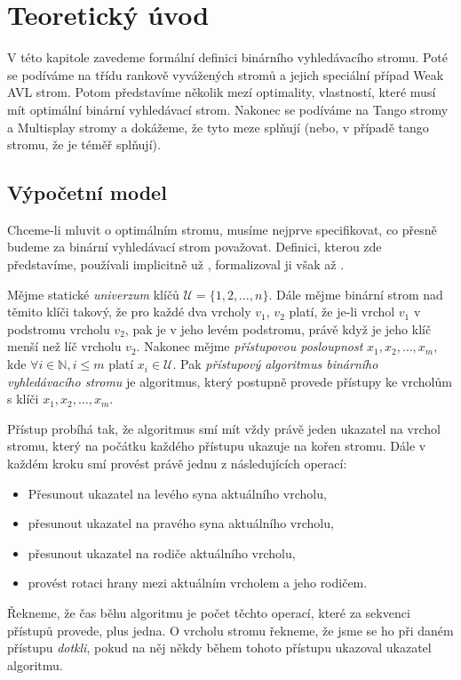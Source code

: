 \chapter{Teoretický úvod}

V této kapitole zavedeme formální definici binárního vyhledávacího stromu. Poté
se podíváme na třídu rankově vyvážených stromů a jejich speciální případ Weak
AVL strom. Potom představíme několik mezí optimality, vlastností, které musí
mít optimální binární vyhledávací strom. Nakonec se podíváme na Tango stromy a
Multisplay stromy a dokážeme, že tyto meze splňují (nebo, v případě tango
stromu, že je téměř splňují).

\section{Výpočetní model}
Chceme-li mluvit o optimálním stromu, musíme nejprve specifikovat, co přesně
budeme za binární vyhledávací strom považovat. Definici, kterou zde
představíme, používali implicitně už \citet{splay}, formalizoval ji však až
\citet{tango}.

\begin{definice}
Mějme statické \emph{univerzum} klíčů $\mathcal U = \{1,2,\dots,n\}$. Dále
mějme binární strom nad těmito klíči takový, že pro každé dva vrcholy $v_1$,
$v_2$ platí, že je-li vrchol $v_1$ v podstromu vrcholu $v_2$, pak je v jeho
levém podstromu, právě když je jeho klíč menší než líč vrcholu $v_2$. Nakonec
mějme \emph{přístupovou posloupnost} $x_1,x_2,\dots,x_m$, kde $\forall i \in
\mathbb N, i\leq m$ platí $x_i\in \mathcal U$. Pak \emph{přístupový algoritmus
binárního vyhledávacího stromu} je algoritmus, který postupně provede přístupy
ke vrcholům s klíči $x_1, x_2,\dots,x_m$.

Přístup probíhá tak, že algoritmus smí mít vždy právě jeden ukazatel na vrchol
stromu, který na počátku každého přístupu ukazuje na kořen stromu. Dále v
každém kroku smí provést právě jednu z následujících operací: 
\begin{itemize}
\item Přesunout ukazatel na levého syna aktuálního vrcholu,
\item přesunout ukazatel na pravého syna aktuálního vrcholu,
\item přesunout ukazatel na rodiče aktuálního vrcholu,
\item provést rotaci hrany mezi aktuálním vrcholem a jeho rodičem.
\end{itemize}

Řekneme, že čas běhu algoritmu je počet těchto operací, které za sekvenci
přístupů provede, plus jedna. O vrcholu stromu řekneme, že jsme se ho při daném
přístupu \emph{dotkli}, pokud na něj někdy během tohoto přístupu ukazoval
ukazatel algoritmu.  \end{definice}

